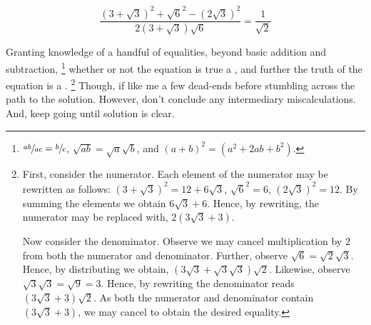 \begin{note}
  \begin{illustration}[Fraction]
    \label{illu:fc:surds}
    \[\frac{(3 + \sqrt{3})^{2} + \sqrt{6}^{2} - (2\sqrt{3})^{2}}{2(3 + \sqrt{3})\sqrt{6}} = \frac{1}{\sqrt{2}}\]
  \end{illustration}

  Granting knowledge of a handful of equalities, beyond basic addition and subtraction,%
  \footnote{
    \(\sfrac{ab}{ac} = \sfrac{b}{c}\),
    \(\sqrt{a b} = \sqrt{a}\sqrt{b}\), and
    \((a + b)^{2} = (a^{2} + 2ab + b^{2})\).
  }
  whether or not the equation is true a \fc{}, and further the truth of the equation is a \fc{}.%
  \footnote{
    \label{illu:fc:surds:fn}
    First, consider the numerator.
    Each element of the numerator may be rewritten as follows:
    \((3 + \sqrt{3})^{2} = 12 + 6\sqrt{3}\), \(\sqrt{6}^{2} = 6\), \((2\sqrt{3})^{2} = 12\).
    By summing the elements we obtain \(6\sqrt{3} + 6\).
    Hence, by rewriting, the numerator may be replaced with, \(2(3\sqrt{3} + 3)\).

    Now consider the denominator.
    Observe we may cancel multiplication by \(2\) from both the numerator and denominator.
    Further, observe \(\sqrt{6} = \sqrt{2}\sqrt{3}\).
    Hence, by distributing we  obtain, \((3\sqrt{3} + \sqrt{3}\sqrt{3})\sqrt{2}\).
    Likewise, observe \(\sqrt{3}\sqrt{3} = \sqrt{9} = 3\).
    Hence, by rewriting the denominator reads \((3\sqrt{3} + 3)\sqrt{2}\).
    As both the numerator and denominator contain \((3\sqrt{3} + 3)\), we may cancel to obtain the desired equality.
  }
  Though, if like me a few dead-ends before stumbling across the path to the solution.
  However, don't conclude any intermediary miscalculations.
  And, keep going until solution is clear.
\end{note}

